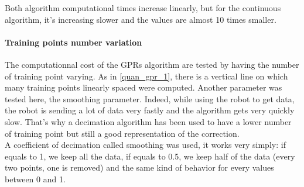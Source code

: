 Both algorithm computational times increase linearly, but for the continuous algorithm, it's increasing slower and the values are almost 10 times smaller.

\paragraph*{Training points number variation}

The computationnal cost of the GPRs algorithm are tested by having the number of training point varying. As in \autoref{quan_gpr_1}, there is a vertical line on which many training points linearly spaced were computed. Another parameter was tested here, the smoothing parameter. Indeed, while using the robot to get data, the robot is sending a lot of data very fastly and the algorithm gets very quickly slow. That's why a decimation algorithm has been used to have a lower number of training point but still a good representation of the correction.\\

A coefficient of decimation called smoothing was used, it works very simply: if equals to 1, we keep all the data, if equals to 0.5, we keep half of the data (every two points, one is removed) and the same kind of behavior for every values between 0 and 1.

